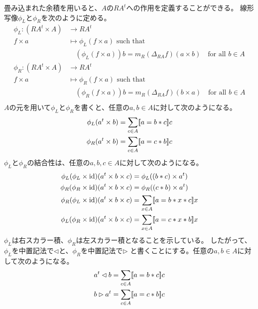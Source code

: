 	畳み込まれた余積を用いると、$A$の$RA^t$への作用を定義することができる。
	線形写像$\phi_L$と$\phi_R$を次のように定める。
	\begin{equation}\label{eq:内積を保つ作用}\begin{split} %
		\phi_L: (RA^t\times A) &\to RA^t \\
			f\times a &\mapsto \phi_L(f\times a) \text{ such that} \\
			&\quad (\phi_L(f\times a))b=m_R(\Delta_{RA}f)(a\times b)\quad\text{for all }b\in A \\
		\phi_R: (RA^t\times A) &\to RA^t \\
			f\times a &\mapsto \phi_R(f\times a) \text{ such that} \\
			&\quad (\phi_R(f\times a))b=m_R(\Delta_{RA}f)(b\times a)\quad\text{for all }b\in A \\
	\end{split}\end{equation} %
	$A$の元を用いて$\phi_L$と$\phi_R$を書くと、任意の$a,b\in A$に対して次のようになる。
	\begin{equation}\begin{split} %
		\phi_L(a^t\times b) &= \sum_{c\in A}\jump{a=b*c}c \\
		\phi_R(a^t\times b) &= \sum_{c\in A}\jump{a=c*b}c \\
	\end{split}\end{equation} %
	$\phi_L$と$\phi_R$の結合性は、任意の$a,b,c\in A$に対して次のようになる。
	\begin{equation}\begin{split} %
		\phi_L(\phi_L\times \myid)(a^t\times b\times c) &= \phi_L((b*c)\times a^t) \\
		\phi_R(\phi_R\times \myid)(a^t\times b\times c) &= \phi_R((c*b)\times a^t) \\
		\phi_R(\phi_L\times \myid)(a^t\times b\times c) &= \sum_{x\in A}\jump{a=b*x*c}x \\
		\phi_L(\phi_R\times \myid)(a^t\times b\times c) &= \sum_{x\in A}\jump{a=c*x*b}x \\
	\end{split}\end{equation} %
	$\phi_L$は右スカラー積、$\phi_R$は左スカラー積となることを示している。
	したがって、$\phi_L$を中置記法で$\lhd$と、$\phi_R$を中置記法で$\rhd$
	と書くことにする。任意の$a,b\in A$に対して次のようになる。
	\begin{equation}\begin{split} %
		a^t\lhd b &= \sum_{c\in A}\jump{a=b*c}c \\
		b\rhd a^t &= \sum_{c\in A}\jump{a=c*b}c \\
	\end{split}\end{equation} %
	
